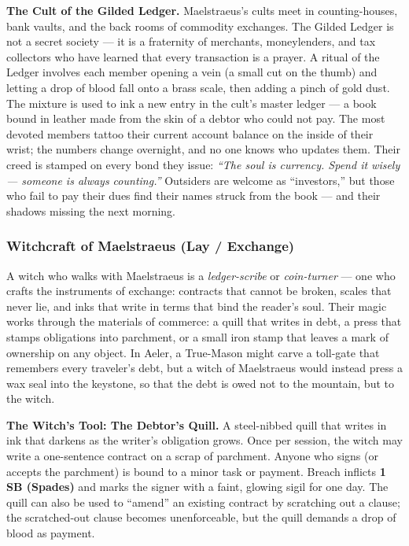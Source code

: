 \textbf{The Cult of the Gilded Ledger.} Maelstraeus's cults meet in counting-houses, bank vaults, and the back rooms of commodity exchanges. The Gilded Ledger is not a secret society --- it is a fraternity of merchants, moneylenders, and tax collectors who have learned that every transaction is a prayer. A ritual of the Ledger involves each member opening a vein (a small cut on the thumb) and letting a drop of blood fall onto a brass scale, then adding a pinch of gold dust. The mixture is used to ink a new entry in the cult's master ledger --- a book bound in leather made from the skin of a debtor who could not pay. The most devoted members tattoo their current account balance on the inside of their wrist; the numbers change overnight, and no one knows who updates them. Their creed is stamped on every bond they issue: \textit{``The soul is currency. Spend it wisely --- someone is always counting.''} Outsiders are welcome as ``investors,'' but those who fail to pay their dues find their names struck from the book --- and their shadows missing the next morning.

\subsubsection*{Witchcraft of Maelstraeus (Lay / Exchange)}

A witch who walks with Maelstraeus is a \textit{ledger-scribe} or \textit{coin-turner} --- one who crafts the instruments of exchange: contracts that cannot be broken, scales that never lie, and inks that write in terms that bind the reader's soul. Their magic works through the materials of commerce: a quill that writes in debt, a press that stamps obligations into parchment, or a small iron stamp that leaves a mark of ownership on any object. In Aeler, a True-Mason might carve a toll-gate that remembers every traveler's debt, but a witch of Maelstraeus would instead press a wax seal into the keystone, so that the debt is owed not to the mountain, but to the witch.

\textbf{The Witch's Tool: The Debtor's Quill.} A steel-nibbed quill that writes in ink that darkens as the writer's obligation grows. Once per session, the witch may write a one-sentence contract on a scrap of parchment. Anyone who signs (or accepts the parchment) is bound to a minor task or payment. Breach inflicts \textbf{1 SB (Spades)} and marks the signer with a faint, glowing sigil for one day. The quill can also be used to ``amend'' an existing contract by scratching out a clause; the scratched-out clause becomes unenforceable, but the quill demands a drop of blood as payment.

